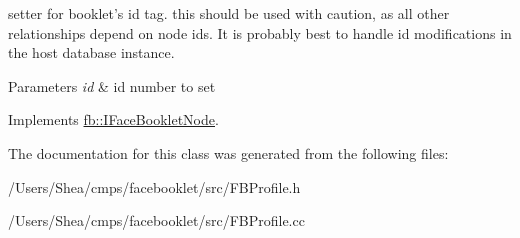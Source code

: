 setter for booklet's id tag.  this should be used with caution, as all other relationships depend on node ids. It is probably best to handle id modifications in the host database instance. 


\begin{DoxyParams}{Parameters}
{\em id} & id number to set \\
\hline
\end{DoxyParams}


Implements \hyperlink{structfb_1_1_i_face_booklet_node_a944a07a514d6c88414c533dc7be3193d}{fb\+::\+I\+Face\+Booklet\+Node}.



The documentation for this class was generated from the following files\+:\begin{DoxyCompactItemize}
\item 
/\+Users/\+Shea/cmps/facebooklet/src/F\+B\+Profile.\+h\item 
/\+Users/\+Shea/cmps/facebooklet/src/F\+B\+Profile.\+cc\end{DoxyCompactItemize}
